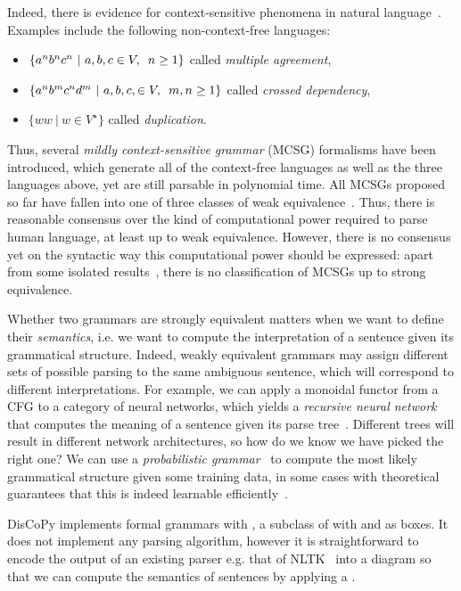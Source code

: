 Indeed, there is evidence for context-sensitive phenomena in natural language~\cite{Shieber87}.
Examples include the following non-context-free languages:
\begin{itemize}
  \item $\{ a^n b^n c^n \ \vert \ a, b, c \in V, \enspace n \geq 1 \}$ called \emph{multiple agreement},
  \item $\{ a^n b^m c^n d^m \ \vert \ a, b, c, \in V, \enspace m, n \geq 1 \}$ called \emph{crossed dependency},
  \item $\{ w w \ \vert \ w \in V^\star \}$ called \emph{duplication}.
\end{itemize}
Thus, several \emph{mildly context-sensitive grammar} (MCSG) formalisms have been introduced, which generate all of the context-free languages as well as the three languages above, yet are still parsable in polynomial time.
All MCSGs proposed so far have fallen into one of three classes of weak equivalence~\cite{Weir88}.
Thus, there is reasonable consensus over the kind of computational power required to parse human language, at least up to weak equivalence.
However, there is no consensus yet on the syntactic way this computational power should be expressed: apart from some isolated results~\cite{SchifferMaletti21}, there is no classification of MCSGs up to strong equivalence.

Whether two grammars are strongly equivalent matters when we want to define their \emph{semantics}, i.e. we want to compute the interpretation of a sentence given its grammatical structure.
Indeed, weakly equivalent grammars may assign different sets of possible parsing to the same ambiguous sentence, which will correspond to different interpretations.
For example, we can apply a monoidal functor from a CFG to a category of neural networks, which yields a \emph{recursive neural network} that computes the meaning of a sentence given its parse tree~\cite{SocherEtAl11,SocherEtAl13}.
Different trees will result in different network architectures, so how do we know we have picked the right one?
We can use a \emph{probabilistic grammar}~\cite{Salomaa69} to compute the most likely grammatical structure given some training data, in some cases with theoretical guarantees that this is indeed learnable efficiently~\cite{ShibataYoshinaka16}.

DisCoPy implements formal grammars with , a subclass of  with  and  as boxes.
It does not implement any parsing algorithm, however it is straightforward to encode the output of an existing parser e.g. that of NLTK~\cite{LoperBird02} into a  diagram so that we can compute the semantics of sentences by applying a .

